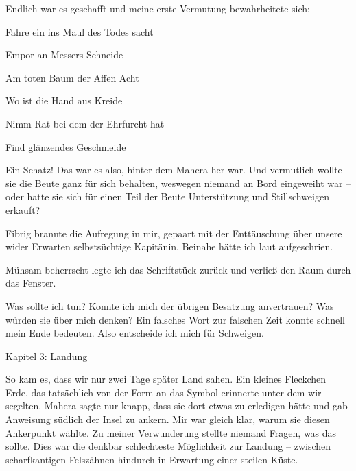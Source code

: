 Endlich war es geschafft und meine erste Vermutung bewahrheitete sich:

\vspace{0.5cm}\noindent
\begin{itshape}Fahre ein ins Maul des Todes sacht

Empor an Messers Schneide

\vspace{0.5cm}\noindent
Am toten Baum der Affen Acht

Wo ist die Hand aus Kreide

\vspace{0.5cm}\noindent
Nimm Rat bei dem der Ehrfurcht hat

Find glänzendes Geschmeide\end{itshape}

{}

\vspace{0.5cm}\noindent
Ein Schatz! Das war es also, hinter dem Mahera her war. Und vermutlich wollte sie die Beute ganz für sich behalten, weswegen niemand an Bord eingeweiht war -- oder hatte sie sich für einen Teil der Beute Unterstützung und Stillschweigen erkauft?

Fibrig brannte die Aufregung in mir, gepaart mit der Enttäuschung über unsere wider Erwarten selbstsüchtige Kapitänin. Beinahe hätte ich laut aufgeschrien.

Mühsam beherrscht legte ich das Schriftstück zurück und verließ den Raum durch das Fenster.

Was sollte ich tun? Konnte ich mich der übrigen Besatzung anvertrauen? Was würden sie über mich denken? Ein falsches Wort zur falschen Zeit konnte schnell mein Ende bedeuten. Also entscheide ich mich für Schweigen.

\vspace{0.5cm}\noindent

{\label{2Kapitel 3: Landung}\vspace{0.5cm}\noindent\LARGE Kapitel 3: Landung}
\renewcommand{\storychapter}{Kapitel 3: Landung}

\vspace{0.5cm}\noindent
So kam es, dass wir nur zwei Tage später Land sahen. Ein kleines Fleckchen Erde, das tatsächlich von der Form an das Symbol erinnerte unter dem wir segelten. Mahera sagte nur knapp, dass sie dort etwas zu erledigen hätte und gab Anweisung südlich der Insel zu ankern. Mir war gleich klar, warum sie diesen Ankerpunkt wählte. Zu meiner Verwunderung stellte niemand Fragen, was das sollte. Dies war die denkbar schlechteste Möglichkeit zur Landung -- zwischen scharfkantigen Felszähnen hindurch in Erwartung einer steilen Küste.

